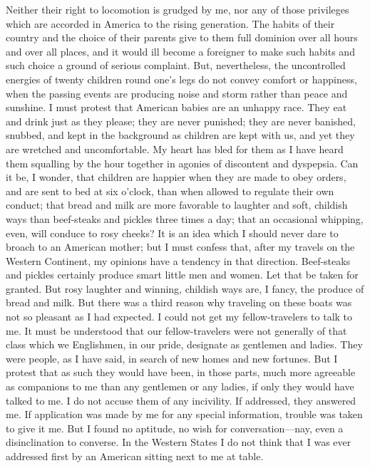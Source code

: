 Neither their right to locomotion is grudged by me, nor any of
those privileges which are accorded in America to the rising
generation.  The habits of their country and the choice of their
parents give to them full dominion over all hours and over all
places, and it would ill become a foreigner to make such habits and
such choice a ground of serious complaint.  But, nevertheless, the
uncontrolled energies of twenty children round one's legs do not
convey comfort or happiness, when the passing events are producing
noise and storm rather than peace and sunshine.  I must protest
that American babies are an unhappy race.  They eat and drink just
as they please; they are never punished; they are never banished,
snubbed, and kept in the background as children are kept with us,
and yet they are wretched and uncomfortable.  My heart has bled for
them as I have heard them squalling by the hour together in agonies
of discontent and dyspepsia.  Can it be, I wonder, that children
are happier when they are made to obey orders, and are sent to bed
at six o'clock, than when allowed to regulate their own conduct;
that bread and milk are more favorable to laughter and soft,
childish ways than beef-steaks and pickles three times a day; that
an occasional whipping, even, will conduce to rosy cheeks?  It is
an idea which I should never dare to broach to an American mother;
but I must confess that, after my travels on the Western Continent,
my opinions have a tendency in that direction.  Beef-steaks and
pickles certainly produce smart little men and women.  Let that be
taken for granted.  But rosy laughter and winning, childish ways
are, I fancy, the produce of bread and milk.  But there was a third
reason why traveling on these boats was not so pleasant as I had
expected.  I could not get my fellow-travelers to talk to me.  It
must be understood that our fellow-travelers were not generally of
that class which we Englishmen, in our pride, designate as
gentlemen and ladies.  They were people, as I have said, in search
of new homes and new fortunes.  But I protest that as such they
would have been, in those parts, much more agreeable as companions
to me than any gentlemen or any ladies, if only they would have
talked to me.  I do not accuse them of any incivility.  If
addressed, they answered me.  If application was made by me for any
special information, trouble was taken to give it me.  But I found
no aptitude, no wish for conversation---nay, even a disinclination
to converse.  In the Western States I do not think that I was ever
addressed first by an American sitting next to me at table.
